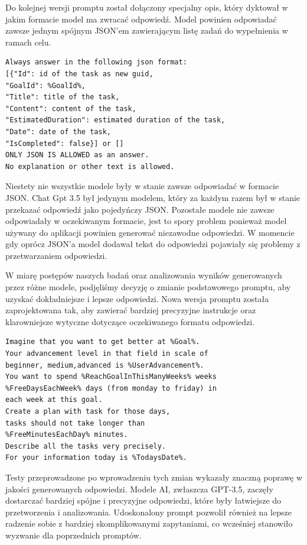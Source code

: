 Do kolejnej wersji promptu został dołączony specjalny opis, który dyktował w jakim formacie model ma zwracać odpowiedź. Model powinien odpowiadać zawsze jednym spójnym JSON'em zawierającym listę zadań do wypełnienia w ramach celu. 

\begin{lstlisting}[language=html, caption=Część promptu odpowiedzialna za formatowanie, linewidth=160mm]
Always answer in the following json format:
[{"Id": id of the task as new guid,
"GoalId": %GoalId%,
"Title": title of the task,
"Content": content of the task,
"EstimatedDuration": estimated duration of the task,
"Date": date of the task,
"IsCompleted": false}] or []
ONLY JSON IS ALLOWED as an answer. 
No explanation or other text is allowed.
\end{lstlisting}

Niestety nie wszystkie modele były w stanie zawsze odpowiadać w formacie JSON. Chat Gpt 3.5 był jedynym modelem, który za każdym razem był w stanie przekazać odpowiedź jako pojedyńczy JSON. Pozostałe modele nie zawsze odpowiadały w oczekiwanym formacie, jest to spory problem ponieważ model używany do aplikacji powinien generować niezawodne odpowiedzi. W momencie gdy oprócz JSON'a model dodawał tekst do odpowiedzi pojawiały się problemy z przetwarzaniem odpowiedzi.

W miarę postępów naszych badań oraz analizowania wyników generowanych przez różne modele, podjęliśmy decyzję o zmianie podstawowego promptu, aby uzyskać dokładniejsze i lepsze odpowiedzi. Nowa wersja promptu została zaprojektowana tak, aby zawierać bardziej precyzyjne instrukcje oraz klarowniejsze wytyczne dotyczące oczekiwanego formatu odpowiedzi.

\begin{lstlisting}[language=html, caption=Nowy podstawowy prompt, linewidth=140mm]
Imagine that you want to get better at %Goal%. 
Your advancement level in that field in scale of 
beginner, medium,advanced is %UserAdvancement%. 
You want to spend %ReachGoalInThisManyWeeks% weeks 
%FreeDaysEachWeek% days (from monday to friday) in 
each week at this goal.
Create a plan with task for those days, 
tasks should not take longer than
%FreeMinutesEachDay% minutes.
Describe all the tasks very precisely. 
For your information today is %TodaysDate%.
\end{lstlisting}

Testy przeprowadzone po wprowadzeniu tych zmian wykazały znaczną poprawę w jakości generowanych odpowiedzi. Modele AI, zwłaszcza GPT-3.5, zaczęły dostarczać bardziej spójne i precyzyjne odpowiedzi, które były łatwiejsze do przetworzenia i analizowania. Udoskonalony prompt pozwolił również na lepsze radzenie sobie z bardziej skomplikowanymi zapytaniami, co wcześniej stanowiło wyzwanie dla poprzednich promptów.


